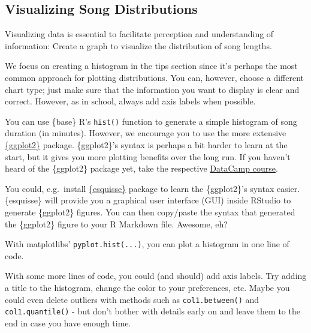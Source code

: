 \documentclass[
  11pt,
]{book}
\newenvironment{tips}[1]
  {
  \begin{itemize}
  \footnotesize
  \renewcommand{\labelitemi}{
    \raisebox{-.7\height}[0pt][0pt]{
      {\setkeys{Gin}{width=3em,keepaspectratio}
        \texttt{[image: images/\#1.png]}}
    }
  }
  \setlength{\fboxsep}{1em}
  \begin{rbox}
  \item
  }
  {
  \end{rbox}
  \end{itemize}
  }
\newenvironment{tipsp}[1]
  {
  \begin{itemize}
  \footnotesize
  \renewcommand{\labelitemi}{
    \raisebox{-.7\height}[0pt][0pt]{
      {\setkeys{Gin}{width=3em,keepaspectratio}
        \texttt{[image: images/\#1.png]}}
    }
  }
  \setlength{\fboxsep}{1em}
  \begin{pbox}
  \item
  }
  {
  \end{pbox}
  \end{itemize}
  }
\begin{document}
\hypertarget{visualizing-song-distributions}{%
\subsection{Visualizing Song Distributions}\label{visualizing-song-distributions}}

Visualizing data is essential to facilitate perception and understanding of information: Create a graph to visualize the distribution of song lengths.

We focus on creating a histogram in the tips section since it's perhaps the most common approach for plotting distributions. You can, however, choose a different chart type; just make sure that the information you want to display is clear and correct.
However, as in school, always add axis labels when possible.

\begin{tips}r

You can use \{base\} R's \texttt{hist()} function to generate a simple histogram of song duration (in minutes). However, we encourage you to use the more extensive \href{https://ggplot2.tidyverse.org}{\{ggplot2\}} package. \{ggplot2\}'s syntax is perhaps a bit harder to learn at the start, but it gives you more plotting benefits over the long run. If you haven't heard of the \{ggplot2\} package yet, take the respective \href{https://www.datacamp.com/courses/data-visualization-with-ggplot2-1}{DataCamp course}.

You could, e.g.~install \href{https://github.com/dreamRs/esquisse\#esquisse-}{\{esquisse\}} package to learn the \{ggplot2\}'s syntax easier. \{esquisse\} will provide you a graphical user interface (GUI) inside RStudio to generate \{ggplot2\} figures. You can then copy/paste the syntax that generated the \{ggplot2\} figure to your R Markdown file. Awesome, eh?

\end{tips}

\begin{tipsp}p

With matplotlibs' \texttt{pyplot.hist(...)}, you can plot a histogram in one line of code.

With some more lines of code, you could (and should) add axis labels.
Try adding a title to the histogram, change the color to your preferences, etc.
Maybe you could even delete outliers with methods such as \texttt{col1.between()} and \texttt{col1.quantile()} - but don't bother with details early on and leave them to the end in case you have enough time.

\end{tipsp}
\end{document}
